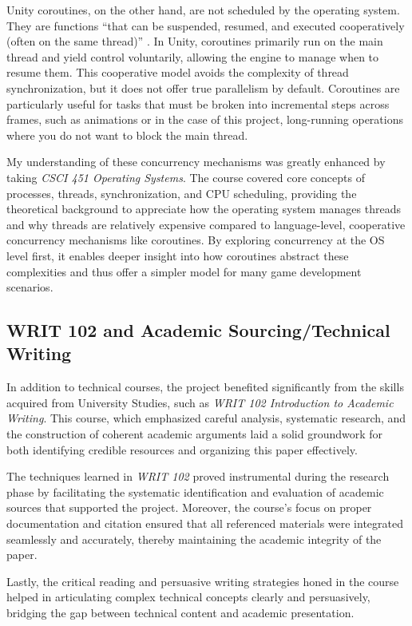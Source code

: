 \documentclass[a4paper, 12pt, one column, aas_macros]{article}
\begin{document}
Unity coroutines, on the other hand, are not scheduled by the operating system. They are functions ``that can be suspended, resumed, and executed cooperatively (often on the same thread)'' \cite{nosenko}. In Unity, coroutines primarily run on the main thread and yield control voluntarily, allowing the engine to manage when to resume them. This cooperative model avoids the complexity of thread synchronization, but it does not offer true parallelism by default. Coroutines are particularly useful for tasks that must be broken into incremental steps across frames, such as animations or in the case of this project, long-running operations where you do not want to block the main thread.

My understanding of these concurrency mechanisms was greatly enhanced by taking \textit{CSCI 451 Operating Systems}. The course covered core concepts of processes, threads, synchronization, and CPU scheduling, providing the theoretical background to appreciate how the operating system manages threads and why threads are relatively expensive compared to language-level, cooperative concurrency mechanisms like coroutines. By exploring concurrency at the OS level first, it enables deeper insight into how coroutines abstract these complexities and thus offer a simpler model for many game development scenarios.

\subsection{WRIT 102 and Academic Sourcing/Technical Writing}
In addition to technical courses, the project benefited significantly from the skills acquired from University Studies, such as \textit{WRIT 102 Introduction to Academic Writing}. This course, which emphasized careful analysis, systematic research, and the construction of coherent academic arguments laid a solid groundwork for both identifying credible resources and organizing this paper effectively.

The techniques learned in \textit{WRIT 102} proved instrumental during the research phase by facilitating the systematic identification and evaluation of academic sources that supported the project. Moreover, the course's focus on proper documentation and citation ensured that all referenced materials were integrated seamlessly and accurately, thereby maintaining the academic integrity of the paper.

Lastly, the critical reading and persuasive writing strategies honed in the course helped in articulating complex technical concepts clearly and persuasively, bridging the gap between technical content and academic presentation.
\end{document}
